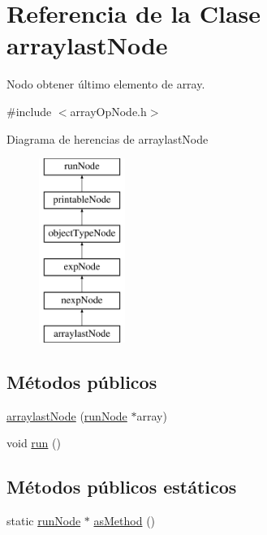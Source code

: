 \hypertarget{classarraylastNode}{\section{Referencia de la Clase arraylast\-Node}
\label{classarraylastNode}
}


Nodo obtener último elemento de array.  




{\ttfamily \#include $<$array\-Op\-Node.\-h$>$}

Diagrama de herencias de arraylast\-Node\begin{figure}[H]
\begin{center}
\leavevmode
\includegraphics[height=6.000000cm]{classarraylastNode}
\end{center}
\end{figure}
\subsection*{Métodos públicos}
\begin{DoxyCompactItemize}
\item 
\hyperlink{classarraylastNode_a17f8b2bbc08ddfd7d5cb082ef036d94c}{arraylast\-Node} (\hyperlink{classrunNode}{run\-Node} $\ast$array)
\item 
void \hyperlink{classarraylastNode_a408528a55b63a926c665dac74764319a}{run} ()
\end{DoxyCompactItemize}
\subsection*{Métodos públicos estáticos}
\begin{DoxyCompactItemize}
\item 
static \hyperlink{classrunNode}{run\-Node} $\ast$ \hyperlink{classarraylastNode_a0506ee0202021a4ddc48aaf5be139927}{as\-Method} ()
\end{DoxyCompactItemize}


